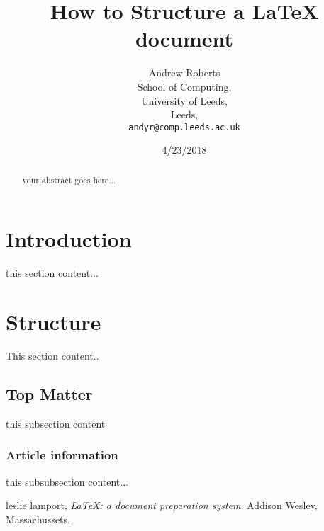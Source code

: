 \documentclass{article}
\begin{document}
    \title{How to Structure a \LaTeX{} document}
        \author{Andrew Roberts \\
        School of Computing, \\
        University of Leeds, \\
        Leeds,\\
        \texttt{andyr@comp.leeds.ac.uk}}
        \date{4/23/2018}
    \maketitle
    
    \begin{abstract}
        your abstract goes here...
        
    \end{abstract}
    \section{Introduction}
        this section content...
    \section{Structure}
        This section content..
    \subsection{Top Matter}
        this subsection content
    \subsubsection{Article information}
        this subsubsection content...

    \begin{thebibliography}{9}
            leslie lamport,
            \emph{\LaTeX: a document preparation system}.
            Addison Wesley, Massachussets,
    \end{thebibliography}
    
\end{document}
